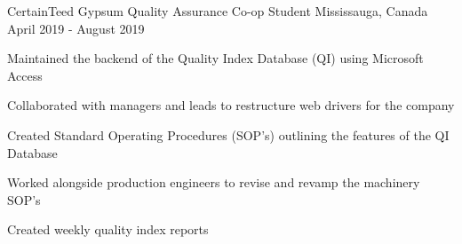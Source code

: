 


\begin{cventries}


\cventry
{CertainTeed Gypsum} %
{Quality Assurance Co-op Student} %
{Mississauga, Canada} %
{April 2019 - August 2019} %
{ %
\begin{cvitems}
\item {Maintained the backend of the Quality Index Database (QI) using Microsoft Access}
\item {Collaborated with managers and leads to restructure web drivers for the company}
\item {Created Standard Operating Procedures (SOP's) outlining the features of the QI Database }
\item {Worked alongside production engineers to revise and revamp the machinery SOP's}
\item {Created weekly quality index reports}
\end{cvitems}
}



\end{cventries}